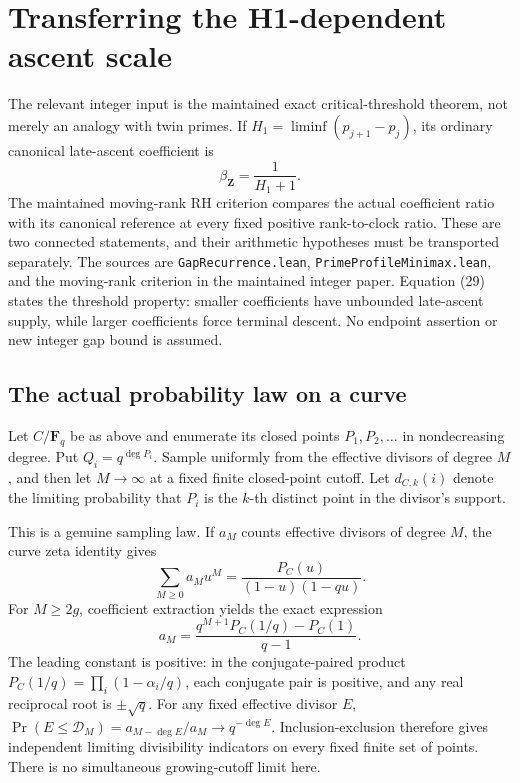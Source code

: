 \documentclass[11pt]{article}
\newcommand{\F}{\mathbf F}
\begin{document}
\section{Transferring the H1-dependent ascent scale}
\label{sec:gapScaleTransfer}

The relevant integer input is the maintained exact critical-threshold
theorem, not merely an analogy with twin primes. If
\(H_1=\liminf(p_{j+1}-p_j)\), its ordinary canonical late-ascent
coefficient is
\[
                         \beta_{\mathbf Z}=\frac1{H_1+1}.
                                                               \tag{29}
\]
The maintained moving-rank RH criterion compares the actual coefficient
ratio with its canonical reference at every fixed positive rank-to-clock
ratio. These are two connected statements, and their arithmetic
hypotheses must be transported separately. The sources are
\texttt{GapRecurrence.lean}, \texttt{PrimeProfileMinimax.lean}, and
the moving-rank criterion in the maintained integer paper.
Equation (29) states the threshold property: smaller coefficients have
unbounded late-ascent supply, while larger coefficients force terminal
descent. No endpoint assertion or new integer gap bound is assumed.

\subsection{The actual probability law on a curve}
Let \(C/\F_q\) be as above and enumerate its closed points
\(P_1,P_2,\ldots\) in nondecreasing degree. Put \(Q_i=q^{\deg P_i}\).
Sample uniformly from the effective divisors of degree \(M\), and
then let \(M\to\infty\) at a fixed finite closed-point cutoff.
Let \(d_{C,k}(i)\) denote the limiting probability that \(P_i\) is
the \(k\)-th distinct point in the divisor's support.

This is a genuine sampling law. If \(a_M\) counts effective divisors
of degree \(M\), the curve zeta identity gives
\[
 \sum_{M\geq0}a_M u^M
       =\frac{P_C(u)}{(1-u)(1-qu)}.
\]
For \(M\geq2g\), coefficient extraction yields the exact expression
\[
 a_M=\frac{q^{M+1}P_C(1/q)-P_C(1)}{q-1}.
\]
The leading constant is positive: in the conjugate-paired product
\(P_C(1/q)=\prod_i(1-\alpha_i/q)\), each conjugate pair is positive,
and any real reciprocal root is \(\pm\sqrt q\).
For any fixed effective divisor \(E\),
\(\Pr(E\leq\mathcal D_M)=a_{M-\deg E}/a_M\to q^{-\deg E}\).
Inclusion-exclusion therefore gives independent limiting divisibility
indicators on every fixed finite set of points.
There is no simultaneous growing-cutoff limit here.
\end{document}
